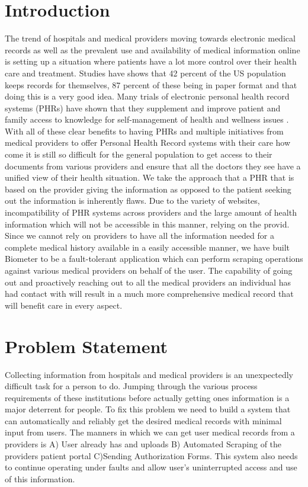 \documentclass{sig-alternate-nocopyright}
\begin{document}
\section{Introduction}
The trend of hospitals and medical providers moving towards electronic medical records as well as the prevalent use and availability of medical information online is setting up a situation where patients have a lot more control over their health care and treatment. Studies have shows that 42 percent of the US population keeps records for themselves, 87 percent of these being in paper format\cite{taylor2004} and that doing this is a very good idea. Many trials of electronic personal health record systems (PHRs) have shown that they supplement and improve patient and family access to knowledge for self-management of health and wellness issues \cite{jones2010}. With all of these clear benefits to having PHRs and multiple initiatives from medical providers to offer Personal Health Record systems  with their care how come it is still so difficult for the general population to get access to their documents from various providers and ensure that all the doctors they see have a unified view of their health situation. We take the approach that a PHR that is based on the provider giving the information as opposed to the patient seeking out the information is inherently flaws. Due to the variety of websites, incompatibility of PHR systems across providers and the large amount of health information which will not be accessible in this manner, relying on the provid. Since we cannot rely on providers to have all the information needed for a complete medical history available in a easily accessible manner, we have built Biometer to be a fault-tolerant application which can perform scraping operations against various medical providers on behalf of the user. The capability of going out and proactively reaching out to all the medical providers an individual has had contact with will result in a much more comprehensive medical record that will benefit care in every aspect.

\section{Problem Statement}
Collecting information from hospitals and medical providers is an unexpectedly difficult task for a person to do. Jumping through the various process requirements of these institutions before actually getting ones information is a major deterrent for people. To fix this problem we need to build a system that can automatically and reliably get the desired medical records with minimal input from users. The manners in which we can get user medical records from a providers is A) User already has and uploads B) Automated Scraping of the providers patient portal C)Sending Authorization Forms. This system also needs to continue operating under faults and allow user's uninterrupted access and use of this information.
\end{document}

